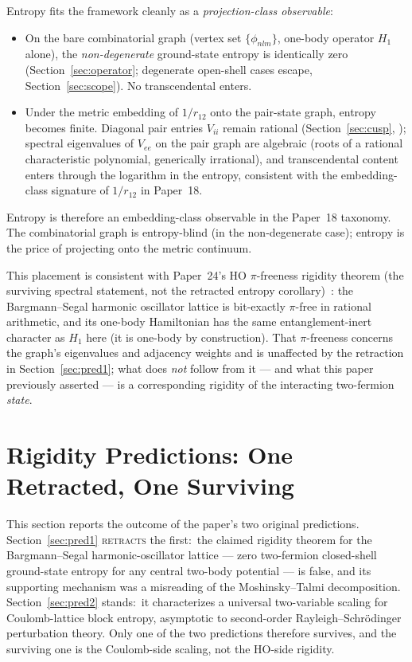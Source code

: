\documentclass[twocolumn,pra,amsmath,amssymb,superscriptaddress]{revtex4-2}
\begin{document}
Entropy fits the framework cleanly as a
\emph{projection-class observable}:
\begin{itemize}
  \item On the bare combinatorial graph (vertex set
    $\{\phi_{nlm}\}$, one-body operator $H_1$ alone), the
    \emph{non-degenerate} ground-state entropy is identically zero
    (Section~\ref{sec:operator}; degenerate open-shell cases escape,
    Section~\ref{sec:scope}).  No transcendental enters.
  \item Under the metric embedding of $1/r_{12}$ onto the
    pair-state graph, entropy becomes finite.  Diagonal pair
    entries $V_{ii}$ remain rational
    (Section~\ref{sec:cusp}, \cite{EnergyGraph}); spectral
    eigenvalues of $V_{ee}$ on the pair graph are algebraic
    (roots of a rational characteristic polynomial, generically
    irrational), and
    transcendental content enters through the logarithm in the
    entropy, consistent with the embedding-class signature of
    $1/r_{12}$ in Paper~18.
\end{itemize}
Entropy is therefore an embedding-class observable in the
Paper~18 taxonomy.  The combinatorial graph is entropy-blind (in the
non-degenerate case);
entropy is the price of projecting onto the metric continuum.

This placement is consistent with Paper~24's HO $\pi$-freeness
rigidity theorem (the surviving spectral statement, not the retracted
entropy corollary)~\cite{GeoVac_Paper24}: the Bargmann--Segal harmonic
oscillator lattice is bit-exactly $\pi$-free in rational
arithmetic, and its one-body Hamiltonian has the same
entanglement-inert character as $H_1$ here (it is one-body by
construction).  That $\pi$-freeness concerns the graph's
eigenvalues and adjacency weights and is unaffected by the
retraction in Section~\ref{sec:pred1}; what does \emph{not}
follow from it --- and what this paper previously asserted --- is
a corresponding rigidity of the interacting two-fermion
\emph{state}.

\section{Rigidity Predictions: One Retracted, One Surviving}
\label{sec:predictions}

This section reports the outcome of the paper's two original
predictions.  Section~\ref{sec:pred1} \textsc{retracts} the
first:\ the claimed rigidity theorem for the Bargmann--Segal
harmonic-oscillator lattice --- zero two-fermion closed-shell
ground-state entropy for any central two-body potential --- is
false, and its supporting mechanism was a misreading of the
Moshinsky--Talmi decomposition.  Section~\ref{sec:pred2}
stands:\ it characterizes a universal two-variable scaling for
Coulomb-lattice block entropy, asymptotic to second-order
Rayleigh--Schr\"odinger perturbation theory.  Only one of the
two predictions therefore survives, and the surviving one is
the Coulomb-side scaling, not the HO-side rigidity.
\end{document}
